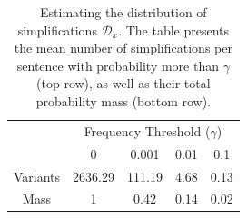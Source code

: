 \documentclass[a4paper]{article}
\begin{document}



\begin{table}[t]
	\centering
	\small
	\singlespacing
	\begin{tabular}{c|c|c|c|c|}
		& \multicolumn{4}{c|}{Frequency Threshold ($\gamma$)}\\ 
		& \multicolumn{1}{c}{0} & \multicolumn{1}{c}{0.001} & \multicolumn{1}{c}{0.01} & \multicolumn{1}{c|}{0.1}
		\\
		\hline
		Variants & 2636.29 & 111.19 & 4.68 & 0.13
		\\
		Mass & 1 & 0.42 & 0.14 & 0.02\\
		\hline
	\end{tabular}
	\caption{\label{tab:simplifications_dist}
		Estimating the distribution of simplifications $\mathcal{D}_x$.
		The table presents the mean number of simplifications per sentence with probability more than
		$\gamma$ (top row), as well as their total probability mass (bottom row).
	}
\end{table}
\end{document}
